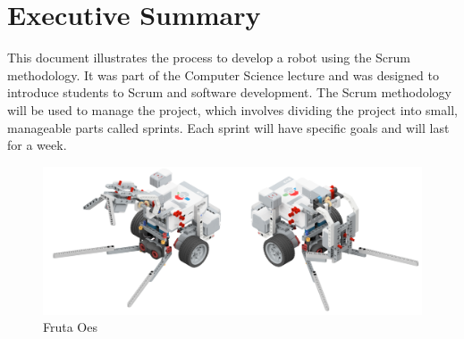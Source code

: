 \section*{Executive Summary}

\noindent This document illustrates the process to develop a robot using the Scrum methodology. It was part of the Computer Science lecture and was designed to introduce students to Scrum and software development.
The Scrum methodology will be used to manage the project, which involves dividing the project into small, manageable parts called sprints. Each sprint will have specific goals and will last for a week.

\begin{figure}[h]
	\centering
	\includegraphics[width=\linewidth]{Graphics/2oppositeViews}
	\caption{Fruta Oes}
	\label{fig:2oppositeviews}
\end{figure}

